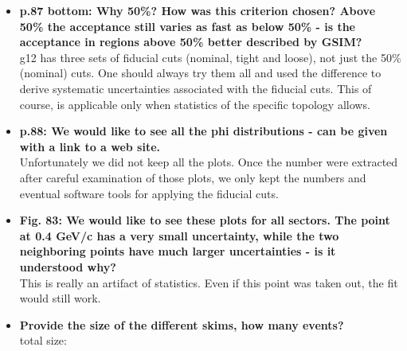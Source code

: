 \documentclass[ 12 pt]{article}
\begin{document}
\begin{itemize}
\item \textbf{p.87 bottom: Why 50\%? How was this criterion chosen? Above 50\% the 
acceptance still varies as fast as below 50\% - is the acceptance in regions 
above 50\% better described by GSIM?}\\

 g12 has three sets of fiducial cuts (nominal, tight and loose), not just the 50\% (nominal) cuts. One should always try them all and used the difference to derive systematic uncertainties associated with the fiducial cuts. This of course, is applicable only when statistics of the specific topology allows.

\item \textbf{p.88: We would like to see all the phi distributions - can be given with a link
to a web site.}\\

Unfortunately we did not keep all the plots. Once the number were extracted after careful examination of those plots, we only kept the numbers and eventual software tools for applying the fiducial cuts. 


\item \textbf{Fig. 83: We would like to see these plots for all sectors. The point at 0.4 GeV/c 
has a very small uncertainty, while the two neighboring points have much 
larger uncertainties - is it understood why?}\\

This is really an artifact of statistics. Even if this point was taken out, the fit would still work.

\item \textbf{Provide the size of the different skims, how many events?}\\

total size:\\


\end{itemize}
\end{document}

